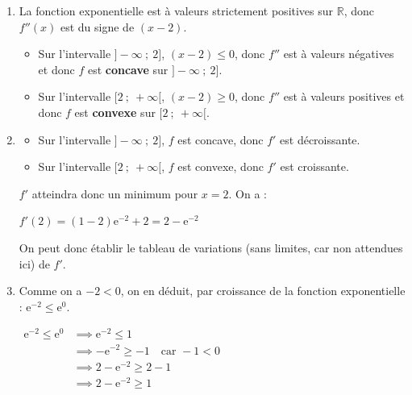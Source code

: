 \documentclass[10pt]{article}
\providecommand{\R}{\mathbb{R}}
\providecommand{\e}{{\mathrm{e}}}
\begin{document}
\begin{enumerate}
Pour tout réel $x$, on a :

$f''(x)=-1 \times \e^{-x} + (1-x) \times \big(- \e^{-x}\big) + 0 = \big(-1 - (1-x)\big)\e^{-x} = (x - 2)\e^{-x}$.

On arrive bien à l'expression annoncée.

\item La fonction exponentielle est à valeurs strictement positives sur $\R$, donc $f''(x)$ est du signe de $(x - 2)$.

\begin{itemize}
\item Sur l'intervalle $]-\infty ~;~ 2]$, $(x - 2) \leqslant 0$, donc $f''$ est à valeurs négatives et donc $f$ est \textbf{concave} sur $]-\infty ~;~ 2]$.
\item Sur l'intervalle $[2 ~;~ +\infty[$, $(x - 2) \geqslant 0$, donc $f''$ est à valeurs positives et donc $f$ est \textbf{convexe} sur $[2 ~;~ +\infty[$.
\end{itemize}

\item 
\begin{itemize}
\item Sur l'intervalle $]-\infty ~;~ 2]$, $f$ est concave, donc $f'$ est décroissante.
\item Sur l'intervalle $[2 ~;~ +\infty[$, $f$ est convexe, donc $f'$ est croissante.
\end{itemize}

$f'$ atteindra donc un minimum pour $x = 2$. On a :

$f'(2) = (1 - 2)\e^{-2} + 2 = 2 - \e^{-2}$

On peut donc établir le tableau de variations (sans limites, car non attendues ici) de $f'$.




		\item Comme on a $-2< 0$, on en déduit, par croissance de la fonction exponentielle : \quad $\e^{-2} \leqslant \e^{0}$.

$\begin{aligned}
\e^{-2} \leqslant \e^{0}
&\implies \e^{-2} \leqslant 1\\
&\implies -\e^{-2} \geqslant -1\quad \text{car }-1 < 0\\
&\implies 2-\e^{-2} \geqslant 2-1\\
&\implies 2-\e^{-2} \geqslant 1\\
\end{aligned}$


\end{enumerate}
\end{document}

